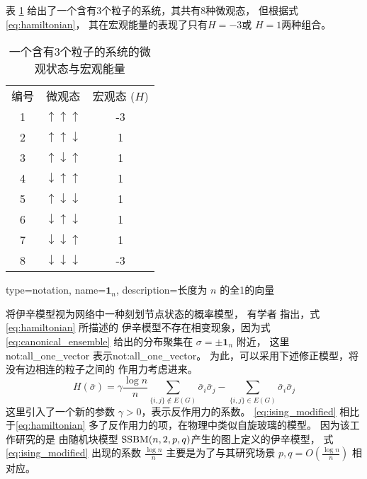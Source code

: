\begin{example}
  表 \ref{tab:particles_3} 给出了一个含有3个粒子的系统，其共有8种微观态，
  但根据式\eqref{eq:hamiltonian}， 其在宏观能量的表现了只有$H=-3$或 $H=1$两种组合。
\begin{table}
  \centering
\begin{tabular}{ccc}
		编号 & 微观态 & 宏观态 ($H$) \\
		1 & $\uparrow\uparrow\uparrow$ & -3 \\
		2 & $\uparrow\uparrow\downarrow$ & 1 \\
		3 & $\uparrow\downarrow\uparrow$ & 1 \\
		4 & $\downarrow\uparrow\uparrow$ & 1 \\
		5 & $\uparrow\downarrow\downarrow$ & 1    \\
6 & $\downarrow\uparrow\downarrow$ & 1 \\
7 & $\downarrow\downarrow\uparrow$ & 1 \\
8 & $\downarrow\downarrow\downarrow$ & -3 \\
\end{tabular}
\caption{一个含有3个粒子的系统的微观状态与宏观能量}
\label{tab:particles_3}
\end{table}
\end{example}

{
  type=notation,
  name={\ensuremath{\mathbf{1}_n}},
  description={长度为 $n$ 的全1的向量}
}

将伊辛模型视为网络中一种刻划节点状态的概率模型，
有学者\cite{ye2020exact}
指出，式\eqref{eq:hamiltonian} 所描述的
伊辛模型不存在相变现象，因为式\eqref{eq:canonical_ensemble}
给出的分布聚集在 $\sigma=\pm \mathbf{1}_n$ 附近，
这里 \gls{not:all_one_vector} 表示\glsdesc{not:all_one_vector}。
为此，可以采用下述修正模型，将没有边相连的粒子之间的
作用力考虑进来。
\begin{equation}\label{eq:ising_modified}
  H(\bar{\sigma}) = \gamma \frac{\log n}{n} \sum_{\{i,j\}\not\in E(G)}
  \bar{\sigma}_i  \bar{\sigma}_j
	- \sum_{\{i,j\}\in E(G)}
  \bar{\sigma}_i  \bar{\sigma}_j
\end{equation}
这里引入了一个新的参数 $\gamma > 0$，表示反作用力的系数。
\eqref{eq:ising_modified}
相比于\eqref{eq:hamiltonian}
多了反作用力的项，在物理中类似自旋玻璃的模型\cite{lenka2016physics}。
因为该工作研究的是
由随机块模型 $\operatorname{SSBM}(n,2,p,q)$产生的图上定义的伊辛模型，
式\eqref{eq:ising_modified} 出现的系数
$\frac{\log n}{n}$
主要是为了与其研究场景 $p,q=O(\frac{\log n}{n})$
相对应。

